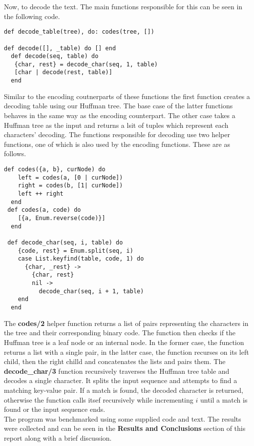 \documentclass[a4paper,11pt]{article}
\begin{document}
Now, to decode the text. The main functions responsible for this can be seen in the following code.
\begin{verbatim}
def decode_table(tree), do: codes(tree, [])

def decode([], _table) do [] end
  def decode(seq, table) do
   {char, rest} = decode_char(seq, 1, table)
   [char | decode(rest, table)]
  end
\end{verbatim}
Similar to the encoding coutnerparts of these functions the first function creates a decoding table using our Huffman tree. The base case of the latter functions behaves in the same way as the encoding counterpart. The other case takes a Huffman tree as the input and returns a lsit of tuples which represent each characters' decoding. The functions responsible for decoding use two helper functions, one of which is also used by the encoding functions. These are as follows.
\begin{verbatim}
def codes({a, b}, curNode) do
    left = codes(a, [0 | curNode])
    right = codes(b, [1| curNode])
    left ++ right
  end
 def codes(a, code) do
    [{a, Enum.reverse(code)}]
  end
  
 def decode_char(seq, i, table) do
    {code, rest} = Enum.split(seq, i)
    case List.keyfind(table, code, 1) do
      {char, _rest} ->
        {char, rest}
        nil ->
          decode_char(seq, i + 1, table)
    end
  end
  \end{verbatim}
The \textbf{codes/2} helper function returns a list of pairs representing the characters in the tree and their corresponding binary code. The function then checks if the Huffman tree is a leaf node or an internal node. In the former case, the function returns a list with a single pair, in the latter case, the function recurses on its left child, then the right chilld and concatenates the lists and pairs them. The \textbf{decode\_char/3} function recursively traverses the Huffman tree table and decodes a single character. It splits the input sequence and attempts to find a matching key-value pair. If a match is found, the decoded character is returned, otherwise the function calls itsef recursively while incrementing $i$ until a match is found or the input sequence ends.\\

The program was benchmarked using some supplied code and text. The results were collected and can be seen in the \textbf{Results and Conclusions} section of this report along with a brief discussion. 
	
\end{document}

